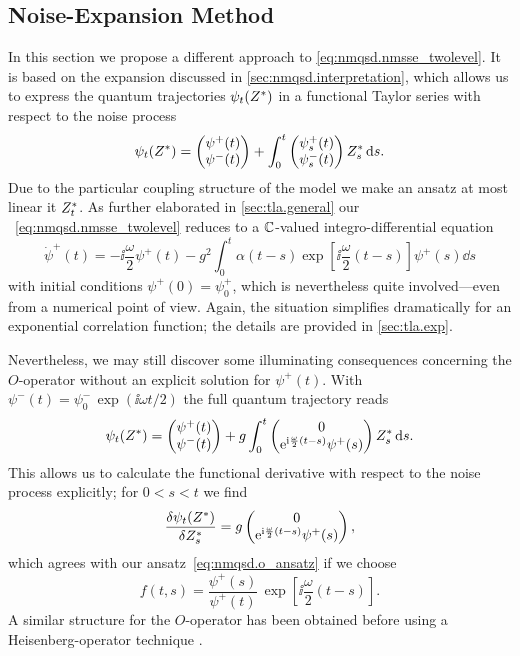 \subsection{Noise-Expansion Method}
\label{sub:nmqsd.expansion}

In this section we propose a different approach to \autoref{eq:nmqsd.nmsse_twolevel}.
It is based on the expansion discussed in \autoref{sec:nmqsd.interpretation}, which allows us to express the quantum trajectories $\psitZ$ in a functional Taylor series with respect to the noise process
\begin{equation*}
  \psitZ = \twovec{\psi^+(t)}{\psi^-(t)} + \int_0^t \twovec{\psi^+_s(t)}{\psi^-_s(t)} \ZZ_s \dd s.
\end{equation*}
Due to the particular coupling structure of the model we make an ansatz at most linear it ${Z}^*_t$.
As further elaborated in \autoref{sec:tla.general} our \NMSSE~\ref{eq:nmqsd.nmsse_twolevel} reduces to a $\mathbb{C}$-valued integro-differential equation
\begin{equation}
  \dot\psi^+(t) = -\ii \frac{\omega}{2} \psi^+(t) - g^2 \int_0^t \alpha(t - s) \exp[\ii \frac{\omega}{2} (t - s)] \psi^+(s) \dd s
  \label{eq:nmqsd.dotpsi_plus}
\end{equation}
with initial conditions $\psi^+(0) = \psi_0^+$, which is nevertheless quite involved---even from a numerical point of view.
Again, the situation simplifies dramatically for an exponential correlation function; the details are provided in \autoref{sec:tla.exp}.

Nevertheless, we may still discover some illuminating consequences concerning the $O$-operator without an explicit solution for $\psi^+(t)$.
With $\psi^-(t) = \psi^-_0 \, \exp(\ii \omega t / 2)$ the full quantum trajectory reads
\begin{equation}
  \psi_t(\ZZ) = \twovec{\psi^+(t)}{\psi^-(t)} + g \int_0^t \twovec{0}{\exp[\ii \frac{\omega}{2} (t-s)] \psi^+(s)} \ZZ_s \dd s.
  \label{eq:nmqsd.solution}
\end{equation}
This allows us to calculate the functional derivative with respect to the noise process explicitly; for $0 < s < t$ we find
\begin{equation*}
  \frac{\delta \psi_t(\ZZ)}{\delta \ZZ_s} = g \twovec{0}{\exp[\ii \frac{\omega}{2} (t-s)] \psi^+(s)},
\end{equation*}
which agrees with our ansatz~\ref{eq:nmqsd.o_ansatz} if we choose
\begin{equation}
  f(t, s) = \frac{\psi^+(s)}{\psi^+(t)} \, \exp[\ii \frac{\omega}{2}(t - s)].
  \label{eq:nmqsd.o_ansatz_psi}
\end{equation}
A similar structure for the $O$-operator has been obtained before using a Heisenberg-operator technique \cite{St01_habil}.\\

